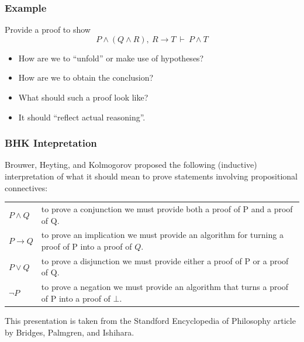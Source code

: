 \documentclass{beamer}
\begin{document}
\begin{frame}
	\frametitle{Example}
	Provide a proof to show $$P \land (Q \land R), \ R \to T  \ \vdash \ P \land T$$


	\vspace{30mm}

	\begin{itemize}
		\item How are we to ``unfold'' or make use of hypotheses? 
		\item How are we to obtain the conclusion? 
		\item What should such a proof look like? 
		\item It should ``reflect actual reasoning''.
	\end{itemize}
\end{frame}

\begin{frame}
  \frametitle{BHK Intepretation}
  Brouwer, Heyting, and Kolmogorov proposed the following (inductive) interpretation of what it should mean to prove statements involving propositional connectives:

  \vspace{5mm}

  \begin{center}
    \begin{tabular}{p{15mm}p{8cm}}
      $P \land Q$ & to prove a conjunction we must provide both a proof of P and a proof of Q. \\      
      $P \to Q$ & to prove an implication we must provide an algorithm for turning a proof of P into a proof of $Q$.\\
      $P \lor Q$ & to prove a disjunction we must provide either a proof of P or a proof of Q. \\
      $\lnot P$ &  to prove a negation we must provide an algorithm that turns a proof of P into a proof of $\bot$.
    \end{tabular}
  \end{center}

  \vspace{5mm}

  This presentation is taken from the Standford Encyclopedia of Philosophy article by Bridges, Palmgren, and Ishihara.
\end{frame}
\end{document}
